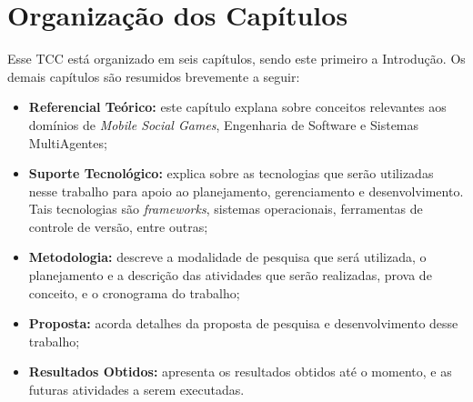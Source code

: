 \section{Organização dos Capítulos}

Esse TCC está organizado em seis capítulos, sendo este primeiro a Introdução. Os demais capítulos são resumidos brevemente a seguir:

  \begin{itemize}
    \item \textbf{Referencial Teórico:} este capítulo explana sobre conceitos relevantes aos domínios de \textit{Mobile Social Games}, Engenharia de Software e Sistemas MultiAgentes;
    \item \textbf{Suporte Tecnológico:} explica sobre as tecnologias que serão utilizadas nesse trabalho para apoio ao planejamento, gerenciamento e desenvolvimento. Tais tecnologias são \textit{frameworks}, sistemas operacionais, ferramentas de controle de versão, entre outras;
    \item \textbf{Metodologia:} descreve a modalidade de pesquisa que será utilizada, o planejamento e a descrição das atividades que serão realizadas, prova de conceito, e o cronograma do trabalho;
    \item \textbf{Proposta:} acorda detalhes da proposta de pesquisa e desenvolvimento desse trabalho;
    \item \textbf{Resultados Obtidos:} apresenta os resultados obtidos até o momento, e as futuras atividades a serem executadas.
  \end{itemize}
